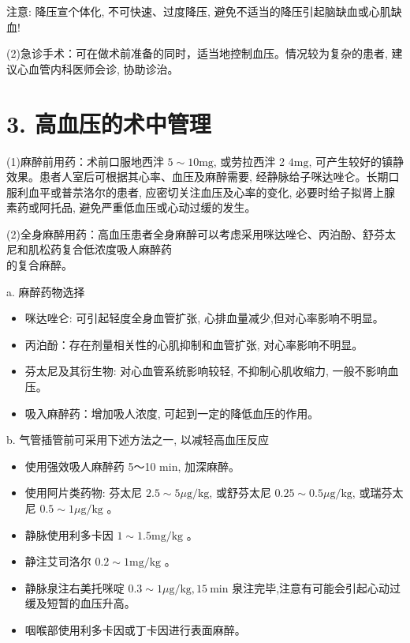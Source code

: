 \documentclass[10pt]{article}
\begin{document}
注意: 降压宣个体化, 不可快速、过度降压, 避免不适当的降压引起脑缺血或心肌缺血!

(2)急诊手术：可在做术前准备的同时，适当地控制血压。情况较为复杂的患者, 建议心血管内科医师会诊, 协助诊治。

\section*{3. 高血压的术中管理}
(1)麻醉前用药：术前口服地西泮 $5 \sim 10 \mathrm{mg}$, 或劳拉西泮 2 $4 \mathrm{mg}$, 可产生较好的镇静效果。患者人室后可根据其心率、血压及麻醉需要, 经静脉给子咪达唑仑。长期口服利血平或普䒬洛尔的患者, 应密切关注血压及心率的变化, 必要时给子拟肾上腺素药或阿托品, 避免严重低血压或心动过缓的发生。

(2)全身麻醉用药：高血压患者全身麻醉可以考虑采用咪达唑仑、丙泊酚、舒芬太尼和肌松药复合低浓度吸人麻醉药\\
的复合麻醉。

a. 麻醉药物选择

\begin{itemize}
  \item 咪达唑仑: 可引起轻度全身血管扩张, 心排血量减少,但对心率影响不明显。
  \item 丙泊酚：存在剂量相关性的心肌抑制和血管扩张, 对心率影响不明显。
  \item 芬太尼及其衍生物: 对心血管系统影响较轻, 不抑制心肌收缩力, 一般不影响血压。
  \item 吸入麻醉药：增加吸人浓度, 可起到一定的降低血压的作用。
\end{itemize}

b. 气管插管前可采用下述方法之一, 以减轻高血压反应

\begin{itemize}
  \item 使用强效吸人麻醉药 5～10 min, 加深麻醉。
  \item 使用阿片类药物: 芬太尼 $2.5 \sim 5 \mu \mathrm{g} / \mathrm{kg}$, 或舒芬太尼 $0.25 \sim 0.5 \mu \mathrm{g} / \mathrm{kg}$, 或瑞芬太尼 $0.5 \sim 1 \mu \mathrm{g} / \mathrm{kg}$ 。
  \item 静脉使用利多卡因 $1 \sim 1.5 \mathrm{mg} / \mathrm{kg}$ 。
  \item 静注艾司洛尔 $0.2 \sim 1 \mathrm{mg} / \mathrm{kg}$ 。
  \item 静脉泉注右美托咪啶 $0.3 \sim 1 \mu \mathrm{g} / \mathrm{kg}, 15 \mathrm{~min}$ 泉注完毕,注意有可能会引起心动过缓及短暂的血压升高。
  \item 咽喉部使用利多卡因或丁卡因进行表面麻醉。
\end{itemize}
\end{document}
